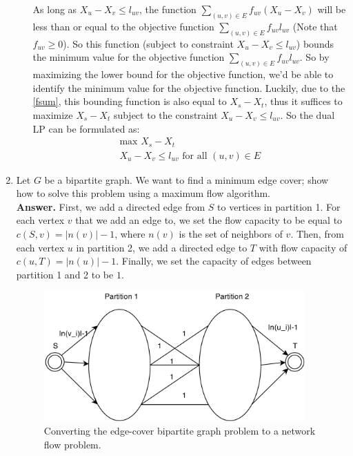 \documentclass[letterpaper,12pt]{article}
\begin{document}
\begin{enumerate}
\begin{enumerate}
	As long as $X_u - X_v \leq l_{uv}$, the function $\sum_{(u, v)\in E} f_{uv}(X_u - X_v)$ will be less than or equal to the objective function $\sum_{(u, v)\in E} f_{uv}l_{uv}$ (Note that $f_{uv}\geq{}0$). So this function (subject to constraint $X_u - X_v \leq l_{uv}$) bounds the minimum value for the objective function $\sum_{(u, v)\in E} f_{uv}l_{uv}$. So by maximizing the lower bound for the objective function, we'd be able to identify the minimum value for the objective function. Luckily, due to the \ref{fsum}, this bounding function is also equal to $X_s - X_t$, thus it suffices to maximize $X_s - X_t$ subject to the constraint $X_u - X_v \leq l_{uv}$. So the dual LP can be formulated as:
	\begin{gather*}
		\text{max }X_s - X_t\\
		X_u - X_v \leq l_{uv}\text{ for all }(u, v) \in E
	\end{gather*}
\end{enumerate}
\item Let $G$ be a bipartite graph. We want to find a minimum edge cover; show
how to solve this problem using a maximum flow algorithm.\\
\textbf{Answer.}
First, we add a directed edge from $S$ to vertices in partition 1. For each vertex $v$ that we add an edge to, we set the flow capacity to be equal to $c(S, v) = |n(v)|-1$, where $n(v)$ is the set of neighbors of $v$. Then, from each vertex $u$ in partition 2, we add a directed edge to $T$ with flow capacity of $c(u, T) = |n(u)| - 1$. Finally, we set the capacity of edges between partition 1 and 2 to be $1$.\\

\begin{figure}[ht!]
	\centering
	\includegraphics[width=10cm]{untitled2.png}
	\caption{Converting the edge-cover bipartite graph problem to a network flow problem.}
\end{figure}


\end{enumerate}
\end{document}
